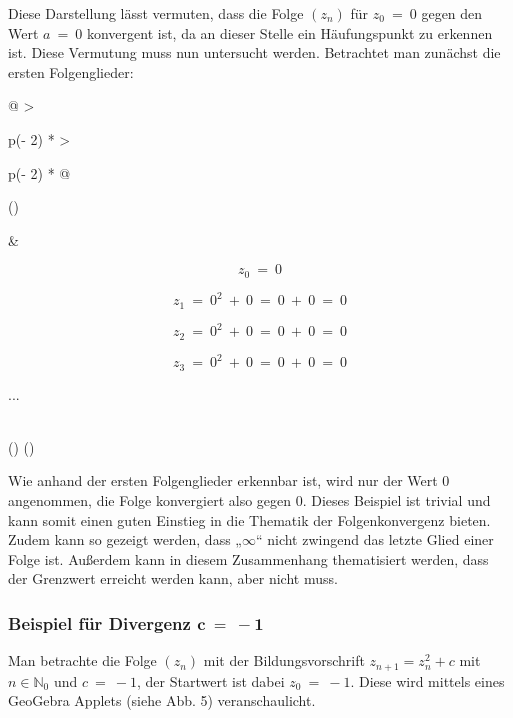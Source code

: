 \documentclass{book}
\begin{document}
Diese Darstellung lässt vermuten, dass die Folge
\(\left( z_{n} \right)\) für \(z_{0}\  = \ 0\) gegen den Wert
\(a\  = \ 0\) konvergent ist, da an dieser Stelle ein Häufungspunkt zu
erkennen ist. Diese Vermutung muss nun untersucht werden. Betrachtet man
zunächst die ersten Folgenglieder:

\begin{longtable}[]{@{}
  >{\raggedright\arraybackslash}p{(\columnwidth - 2\tabcolsep) * }
  >{\raggedright\arraybackslash}p{(\columnwidth - 2\tabcolsep) * }@{}}
\toprule()
\begin{minipage}[b]{\linewidth}\raggedright
\end{minipage} & \begin{minipage}[b]{\linewidth}\raggedright
\[z_{0}\  = \ 0\]

\[z_{1}\  = \ 0^{2}\  + \ 0\  = \ 0\  + \ 0\  = \ 0\]

\[z_{2}\  = \ 0^{2}\  + \ 0\  = \ 0\  + \ 0\  = \ 0\]

\[z_{3}\  = \ 0^{2}\  + \ 0\  = \ 0\  + \ 0\  = \ 0\]

...
\end{minipage} \\
\midrule()
\endhead
\bottomrule()
\end{longtable}

Wie anhand der ersten Folgenglieder erkennbar ist, wird nur der Wert 0
angenommen, die Folge konvergiert also gegen 0. Dieses Beispiel ist
trivial und kann somit einen guten Einstieg in die Thematik der
Folgenkonvergenz bieten. Zudem kann so gezeigt werden, dass
„\(\infty\)`` nicht zwingend das letzte Glied einer Folge ist. Außerdem
kann in diesem Zusammenhang thematisiert werden, dass der Grenzwert
erreicht werden kann, aber nicht muss.

\hypertarget{beispiel-fuxfcr-divergenz-mathbfc---1}{%
\subsubsection{\texorpdfstring{Beispiel für Divergenz
\(\mathbf{c\  = \  - 1}\)}{Beispiel für Divergenz \textbackslash mathbf\{c\textbackslash{}  = \textbackslash{}  - 1\}}}\label{beispiel-fuxfcr-divergenz-mathbfc---1}}

Man betrachte die Folge \(\left( z_{n} \right)\) mit der
Bildungsvorschrift \(z_{n + 1} = z_{n}^{2} + c\) mit
\(n \in \mathbb{N}_{0}\) und \(c\  = \  - 1\), der Startwert ist dabei
\(z_{0}\  = \  - 1\). Diese wird mittels eines GeoGebra Applets (siehe
Abb. 5) veranschaulicht.
\end{document}
